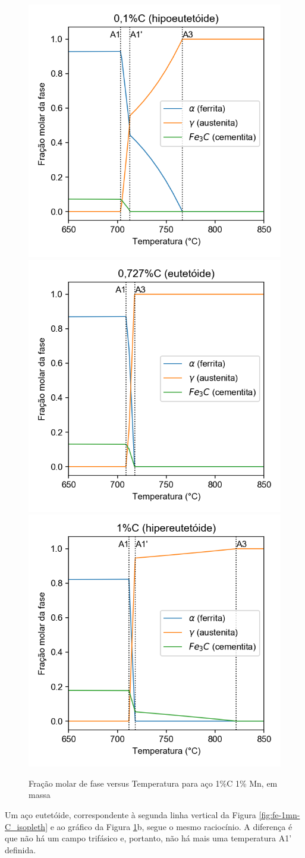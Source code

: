 \documentclass[brazil,tf,epusp]{usp}  %
\begin{document}
\begin{figure}[ht!]
  \includegraphics[width=.5\textwidth]{img/FE-1MN-04C.png}\hfill
  \includegraphics[width=.5\textwidth]{img/FE-1MN-0727C.png}\\
  \includegraphics[width=.5\textwidth]{img/FE-1MN-1C.png}
  \caption{Fração molar de fase versus Temperatura para aço 1\%C 1\% Mn, em massa}
  \label{fig:fe-1mn-c}
\end{figure}

Um aço eutetóide, correspondente à segunda linha vertical da Figura \ref{fig:fe-1mn-C_isopleth} e ao gráfico da Figura \ref{fig:fe-1mn-c}b, segue o mesmo raciocínio. A diferença é que não há um campo trifásico e, portanto, não há mais uma temperatura A1' definida.
\end{document}
